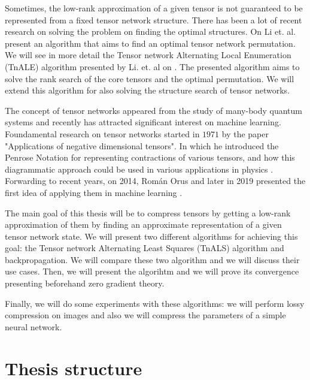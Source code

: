 \documentclass[11pt,a4paper,openright,oneside]{book}
\numberwithin{equation}{section}
\begin{document}
Sometimes, the low-rank approximation of a given tensor is not guaranteed to be represented from
a fixed tensor network structure. There has been a lot of recent research on solving
the problem on finding the optimal structures. On \cite{liPermutationSearchTensor2022} Li et. al. 
present an algorithm that aims to find an optimal tensor network permutation.
We will see in more detail the Tensor network Alternating Local Enumeration (\gls{TnALE}) algorithm presented
by Li. et. al on \cite{liAlternatingLocalEnumeration2023}. The presented algorithm aims to
solve the rank search of the core tensors and the optimal permutation. We will extend this algorithm
for also solving the structure search of tensor networks.

The concept of tensor networks appeared from the study of many-body quantum systems \cite{orusTensorNetworksComplex2019}
and recently has attracted significant interest on machine learning. 
Foundamental research on tensor networks started
in $1971$ by the paper "Applications of negative dimensional tensors". In which
he introduced the Penrose Notation for representing contractions of various tensors, and how this
diagrammatic approach could be used in various applications in physics \cite{biamonteLecturesQuantumTensor2020}. Forwarding
to recent years, on 2014, Román Orus \cite{181204011TensorNetworks} and later in 2019 presented the first
idea of applying them in machine learning \cite{orusTensorNetworksComplex2019}.

The main goal of this thesis will be to compress tensors by getting a low-rank approximation of them by
finding an approximate representation of a given tensor network state. We will present two different algorithms
for achieving this goal: the Tensor network Alternating Least Squares (\gls{TnALS}) algorithm and backpropagation. We will compare these two algorithm and we will
discuss their use cases. Then, we will present the  algorihtm and we will prove its convergence
presenting beforehand zero gradient theory.

Finally, we will do some experiments with these algorithms: we will perform lossy compression on images and
also we will compress the parameters of a simple neural network.


\section{Thesis structure}
\end{document}
